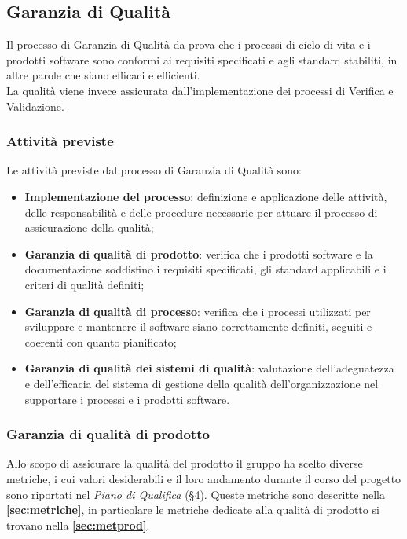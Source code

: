 \documentclass[a4paper,12pt]{article}
\begin{document}
    \subsection{Garanzia di Qualità}
        Il processo di Garanzia di Qualità da prova che i processi di ciclo di vita e i prodotti software sono conformi ai requisiti specificati e agli standard stabiliti, in altre parole che siano efficaci e efficienti.\\
        La qualità viene invece assicurata dall'implementazione dei processi di Verifica e Validazione.

        \subsubsection{Attività previste}
            Le attività previste dal processo di Garanzia di Qualità sono:
            \begin{itemize}
                \item \textbf{Implementazione del processo}: definizione e applicazione delle attività, delle responsabilità e delle procedure necessarie per attuare il processo di assicurazione della qualità;
                \item \textbf{Garanzia di qualità di prodotto}: verifica che i prodotti software e la documentazione soddisfino i requisiti specificati, gli standard applicabili e i criteri di qualità definiti;
                \item \textbf{Garanzia di qualità di processo}: verifica che i processi utilizzati per sviluppare e mantenere il software siano correttamente definiti, seguiti e coerenti con quanto pianificato;
                \item \textbf{Garanzia di qualità dei sistemi di qualità}: valutazione dell'adeguatezza e dell'efficacia del sistema di gestione della qualità dell'organizzazione nel supportare i processi e i prodotti software.
            \end{itemize}

        \subsubsection{Garanzia di qualità di prodotto}
            Allo scopo di assicurare la qualità del prodotto il gruppo ha scelto diverse metriche, i cui valori desiderabili e il loro andamento durante il corso del progetto sono riportati nel \textit{Piano di Qualifica} (\S4).
            Queste metriche sono descritte nella \textbf{\autoref{sec:metriche}}, in particolare le metriche dedicate alla qualità di prodotto si trovano nella \textbf{\autoref{sec:metprod}}.
\end{document}
